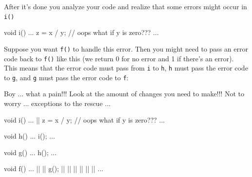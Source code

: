 After it's done you analyze your code and realize that
some errors might occur in \texttt{i()}

\begin{console}
void i()
{    
     ...
     z = x / y; // oops what if y is zero???
     ...
}
\end{console}

Suppose you want \texttt{f()} to handle this error. Then you might need to
pass an error code back to \texttt{f()} like this (we return 0 for no
error and 1 if there's an error). This means that the
error code must pass from \texttt{i} to \texttt{h}, \texttt{h} must pass the
error code to \texttt{g}, and \texttt{g} must pass the error code to
\texttt{f}:


Boy ... what a pain!!! Look at the amount of changes you need to make!!!
Not to worry ... exceptions to the rescue ...

\begin{consolethree}[escapeinside=||]%
void i()
{    
     ...
     ||
     z = x / y; // oops what if y is zero???
     ...
}

void h()
{    
     ...
     i();
     ...
}

void g()
{    
     ...
     h();
     ...
}

void f()
{    
     ...
     ||
     |\EMPHASIZE{\{}|
          g();
     |\EMPHASIZE{\}}|
     ||
     |\EMPHASIZE{\{}|
          ||
          ||
     |\EMPHASIZE{\}}|
     ...
}
\end{consolethree}

